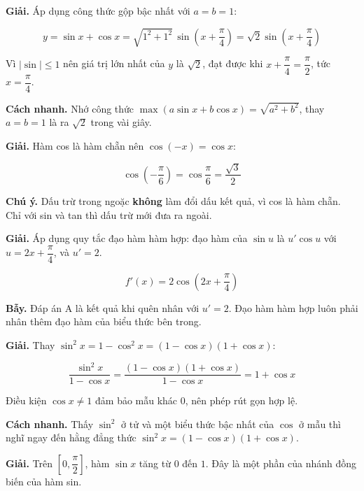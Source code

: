\documentclass[11pt, a4paper]{article}
\begin{document}
\begin{dapan}[4 — Đáp án B]
\textbf{Giải.} Áp dụng công thức gộp bậc nhất với $a = b = 1$:

$$y = \sin x + \cos x = \sqrt{1^2+1^2}\,\sin\!\left(x + \frac{\pi}{4}\right) = \sqrt{2}\sin\!\left(x + \frac{\pi}{4}\right)$$

Vì $|\sin| \le 1$ nên giá trị lớn nhất của $y$ là $\sqrt{2}$, đạt được khi $x + \dfrac{\pi}{4} = \dfrac{\pi}{2}$, tức $x = \dfrac{\pi}{4}$.

\textbf{Cách nhanh.} Nhớ công thức $\max(a\sin x + b\cos x) = \sqrt{a^2+b^2}$, thay $a = b = 1$ là ra $\sqrt{2}$ trong vài giây.
\end{dapan}

\begin{dapan}[5 — Đáp án C]
\textbf{Giải.} Hàm cos là hàm chẵn nên $\cos(-x) = \cos x$:

$$\cos\!\left(-\frac{\pi}{6}\right) = \cos\frac{\pi}{6} = \frac{\sqrt{3}}{2}$$

\textbf{Chú ý.} Dấu trừ trong ngoặc \textbf{không} làm đổi dấu kết quả, vì cos là hàm chẵn. Chỉ với sin và tan thì dấu trừ mới đưa ra ngoài.
\end{dapan}

\begin{dapan}[6 — Đáp án D]
\textbf{Giải.} Áp dụng quy tắc đạo hàm hàm hợp: đạo hàm của $\sin u$ là $u'\cos u$ với $u = 2x + \dfrac{\pi}{4}$, và $u' = 2$.

$$f'(x) = 2\cos\!\left(2x + \frac{\pi}{4}\right)$$

\textbf{Bẫy.} Đáp án A là kết quả khi quên nhân với $u' = 2$. Đạo hàm hàm hợp luôn phải nhân thêm đạo hàm của biểu thức bên trong.
\end{dapan}

\begin{dapan}[7 — Đáp án C]
\textbf{Giải.} Thay $\sin^2 x = 1 - \cos^2 x = (1-\cos x)(1+\cos x)$:

$$\frac{\sin^2 x}{1-\cos x} = \frac{(1-\cos x)(1+\cos x)}{1-\cos x} = 1 + \cos x$$

Điều kiện $\cos x \neq 1$ đảm bảo mẫu khác $0$, nên phép rút gọn hợp lệ.

\textbf{Cách nhanh.} Thấy $\sin^2$ ở tử và một biểu thức bậc nhất của $\cos$ ở mẫu thì nghĩ ngay đến hằng đẳng thức $\sin^2 x = (1-\cos x)(1+\cos x)$.
\end{dapan}

\begin{dapan}[8 — Đáp án A]
\textbf{Giải.} Trên $\left[0, \dfrac{\pi}{2}\right]$, hàm $\sin x$ tăng từ $0$ đến $1$. Đây là một phần của nhánh đồng biến của hàm sin.
\end{dapan}
\end{document}
